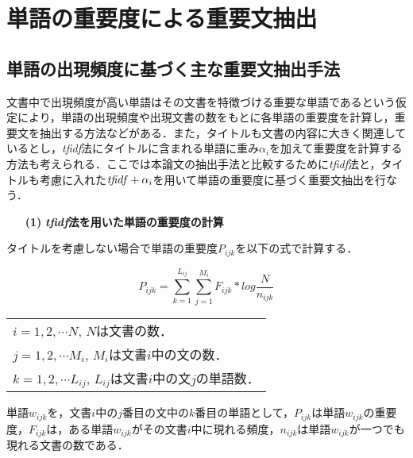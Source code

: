 \section{単語の重要度による重要文抽出}

\subsection{単語の出現頻度に基づく主な重要文抽出手法}

文書中で出現頻度が高い単語はその文書を特徴づける重要な単語であるという仮定により，単語の出現頻度や出現文書の数をもとに各単語の重要度を計算\cite{salton1989}し，重要文を抽出する方法などがある．また，タイトルも文書の内容に大きく関連しているとし，{\it tfidf}法にタイトルに含まれる単語に重み$\alpha_{i}$を加えて重要度を計算する方法も考えられる．ここでは本論文の抽出手法と比較するために{\it tfidf}法と，タイトルも考慮に入れた${\it tfidf}+\alpha_{i}$を用いて単語の重要度に基づく重要文抽出を行なう．
\begin{itemize} 
\item[{\bf (1)}] {\bf {\it tfidf}法を用いた単語の重要度の計算}
\end{itemize}

タイトルを考慮しない場合で単語の重要度$P_{ijk}$を以下の式で計算する．

\begin{equation}
\label{tfidf}
P_{ijk} = \sum_{k=1}^{L_{ij}} \sum_{j=1}^{M_{i}} F_{ijk}*log\frac{N}{n_{ijk}}
\end{equation}

\begin{center}
	\begin{tabular}{l}
		$i = 1, 2, \cdots N$, \hspace*{1em}$N$は文書の数．\\

		$j = 1, 2, \cdots M_{i}$, \hspace*{1em}$M_{i}$は文書$i$中の文の数．\\

		$k = 1, 2, \cdots L_{ij}$, \hspace*{1em}$L_{ij}$は文書$i$中の文$j$の単語数．\\
	\end{tabular}
\end{center}

単語$w_{ijk}$を，文書$i$中の$j$番目の文中の$k$番目の単語として，$P_{ijk}$は単語$w_{ijk}$の重要度，$F_{ijk}$は，ある単語$w_{ijk}$がその文書$i$中に現れる頻度，$n_{ijk}$は単語$w_{ijk}$が一つでも現れる文書の数である．

